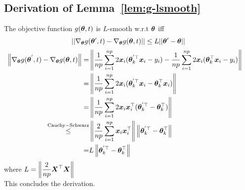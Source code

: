 \documentclass{article} %
\newcommand{\norm}[1]{\left\lVert#1\right\rVert}
\begin{document}
\begin{appendices}
	\subsection{Derivation of Lemma~\ref{lem:g-lsmooth}}
	The objective function 
	$\displaystyle g({\bm{\theta}},t)$ is $L$-smooth w.r.t ${\bm{\theta}}$ iff
	\begin{equation}
		||  \nabla_{\bm{\theta}} g({\bm{\theta}}',t) - \nabla_{\bm{\theta}} g({\bm{\theta}},t) || \leq L|| {\bm{\theta}}' - {\bm{\theta}} || 
	\end{equation}
	\begin{align}
		\norm{ \nabla_{\vtheta} g(\vtheta^{'},t) - \nabla_{\vtheta} g(\vtheta,t) } = &\norm{ \frac{1}{np}\sum_{i=1}^{np}2\vx_i(\vtheta_k^{'\top} \vx_i - y_i) - \frac{1}{np}\sum_{i=1}^{np}2\vx_i(\vtheta_k^\top \vx_i - y_i) } &&\\
		= &\norm{\frac{1}{np}\sum_{i=1}^{np}2\vx_i(\vtheta_k^{'\top}\vx_i - \vtheta_k^\top\vx_i)}&&\\
		= &\norm{\frac{1}{np}\sum_{i=1}^{np}2\vx_i\vx_i^\top(\vtheta_k^{'\top} - \vtheta_k^\top)} &&\\
		\overset{\mathrm{Cauchy-Schwarz}}{\leq} &\norm{\frac{2}{np}\sum_{i=1}^{np}\vx_i\vx_i^\top}\norm{\vtheta_k^{'\top} - \vtheta_k^\top} &&\\
		= &L\norm{\vtheta_k^{'\top} - \vtheta_k^\top} &&
	\end{align}
	where $\displaystyle L = \norm{\frac{2}{np}\mX^\top\mX}$\\
	This concludes the derivation.

\end{appendices}
\end{document}
